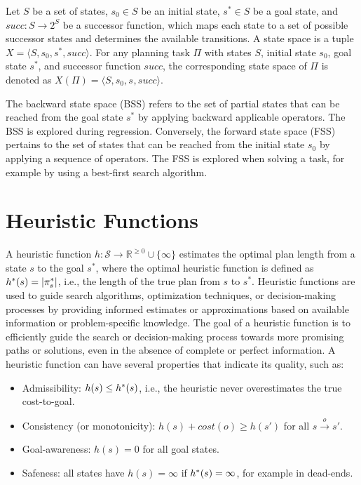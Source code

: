 \documentclass[ppgc,diss,english]{iiufrgs}
\begin{document}
Let $S$ be a set of states, $s_0 \in S$ be an initial state, $s^{*} \in S$ be a goal state, and $succ : S \to 2^S$ be a successor function, which maps each state to a set of possible successor states and determines the available transitions. A state space is a tuple $X = \langle S, s_0, s^{*}, succ \rangle$.
For any planning task $\Pi$ with states $S$, initial state $s_0$, goal state $s^{*}$, and successor function $succ$, the corresponding state space of $\Pi$ is denoted as $X(\Pi) = \langle S, s_0, s^{}, succ \rangle$.

The backward state space (BSS) refers to the set of partial states that can be reached from the goal state $s^*$ by applying backward applicable operators. The BSS is explored during regression. Conversely, the forward state space (FSS) pertains to the set of states that can be reached from the initial state $s_0$ by applying a sequence of operators. The FSS is explored when solving a task, for example by using a best-first search algorithm.


\section{Heuristic Functions}
\label{sec:background-heuristics}
A heuristic function $h:\mathcal{S}\rightarrow \mathbb{R}^{\geq 0}\cup\{\infty\}$ estimates the optimal plan length from a state $s$ to the goal $s^*$, where the optimal heuristic function is defined as $h^{*}(s) = |\pi_{s}^{*}|$, i.e., the length of the true plan from $s$ to $s^{*}$. Heuristic functions are used to guide search algorithms, optimization techniques, or decision-making processes by providing informed estimates or approximations based on available information or problem-specific knowledge. The goal of a heuristic function is to efficiently guide the search or decision-making process towards more promising paths or solutions, even in the absence of complete or perfect information. A heuristic function can have several properties that indicate its quality, such as:

\begin{itemize}
        \item Admissibility: $h(s) \le h^{*}{(s)}$, i.e., the heuristic never overestimates the true cost-to-goal.
        \item Consistency (or monotonicity): $h(s) + cost(o) \ge h(s')$ for all $s \xrightarrow{o} s'$.
        \item Goal-awareness: $h(s) = 0$ for all goal states.
        \item Safeness: all states have $h(s) = \infty$ if $h^{*} (s) = \infty$, for example in dead-ends.
\end{itemize}
\end{document}
